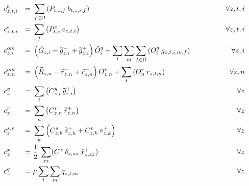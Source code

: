 \documentclass[review, 3p, times, 12pt, authoryear]{elsarticle}
\begin{document}
    \begin{align}
        &c^{b}_{z,t,i}& =&\ \sum_{f \in \Omega} \left( P_{t,z,f}\:b_{t,z,i,f}\right)\qquad \qquad&\forall z,t,i\label{fuel_cost}\\
        &c^{e}_{z,t,i}& =&\ \sum_{f}\left( P^{e}_{t,z}\:e_{z,t,i}\right)\qquad \qquad&\forall z,t,i\\
        &c^{om}_{z,i}& =&\ \left( \widetilde{G}_{z,i} - \widetilde{g}^{-}_{z,i} + \widetilde{g}^{+}_{z,i}\right) \Bar{O}^{g}_{i} + \sum_{t}\sum_{m}\sum_{f \in \Omega}\left( O^{g}_{i}\:g_{z,t,i,m,f}\right)\qquad \qquad&\forall z,i\\
        &c^{om}_{z,n}& =&\ \left( \widetilde{R}_{z,n} - \widetilde{r}^{-}_{z,n} + \widetilde{r}^{+}_{z,n}\right) \Bar{O}^{r}_{z,n} + \sum_{t}\left( O^{r}_{n}\:r_{z,t,n}\right)\qquad \qquad&\forall z,n\\
        &c^{g}_{z}& =&\ \sum_{i}\left( C^{g}_{z,i}\: \widetilde{g}^{+}_{z,i}\right)\qquad \qquad&\forall z\\
        &c^{r}_{z}& =&\ \sum_{n}\left( C^{r}_{z,n}\: \widetilde{r}^{+}_{z,n}\right)\qquad \qquad&\forall z\\
        &c^{s,v}_{z}& =&\ \sum_{k}\left( C^{s}_{z,k}\: \widetilde{s}^{+}_{z,k} + C^{v}_{z,k} \:v^{+}_{z,k}\right)\qquad \qquad&\forall z\\
        &c^{x}_{z}& =&\ \frac{1}{2}\: \sum_{zz} (C^{x}\: \delta_{z,zz}\: \widetilde{x}^{+}_{z,zz})\qquad \qquad&\forall z\label{transmission_expansion_cost}\\
        &c^{q}_{z}& =&\ \mu \sum_{t}\sum_{m} q^{-}_{z,t,m}\qquad \qquad&\forall z\label{lost_load_cost}
    \end{align}
\end{document}
